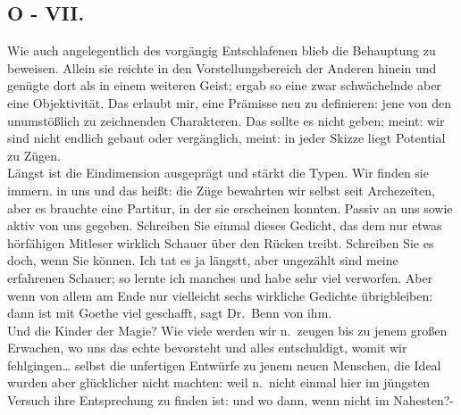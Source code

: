 \documentclass[
]{article}
\author{}
\date{\vspace{-2.5em}}
\begin{document}
\subsection{O - VII.}\label{o---vii.}

Wie auch angelegentlich des vorgängig Entschlafenen blieb die Behauptung
zu beweisen. Allein sie reichte in den Vorstellungsbereich der Anderen
hinein und genügte dort als in einem weiteren Geist; ergab so eine zwar
schwächelnde aber eine Objektivität. Das erlaubt mir, eine Prämisse neu
zu definieren: jene von den unumstößlich zu zeichnenden Charakteren. Das
sollte es nicht geben; meint: wir sind nicht endlich gebaut oder
vergänglich, meint: in jeder Skizze liegt Potential zu Zügen.\\
Längst ist die Eindimension ausgeprägt und stärkt die Typen. Wir finden
sie immern. in uns und das heißt: die Züge bewahrten wir selbst seit
Archezeiten, aber es brauchte eine Partitur, in der sie erscheinen
konnten. Passiv an uns sowie aktiv von uns gegeben. Schreiben Sie einmal
dieses Gedicht, das dem nur etwas hörfähigen Mitleser wirklich Schauer
über den Rücken treibt. Schreiben Sie es doch, wenn Sie können. Ich tat
es ja längstt, aber ungezählt sind meine erfahrenen Schauer; so lernte
ich manches und habe sehr viel verworfen. Aber wenn von allem am Ende
nur vielleicht sechs wirkliche Gedichte übrigbleiben: dann ist mit
Goethe viel geschafft, sagt Dr.~Benn von ihm.\\
Und die Kinder der Magie? Wie viele werden wir n.~zeugen bis zu jenem
großen Erwachen, wo uns das echte bevorsteht und alles entschuldigt,
womit wir fehlgingen\ldots{} selbst die unfertigen Entwürfe zu jenem
neuen Menschen, die Ideal wurden aber glücklicher nicht machten: weil
n.~nicht einmal hier im jüngsten Versuch ihre Entsprechung zu finden
ist: und wo dann, wenn nicht im Nahesten?-
\end{document}
